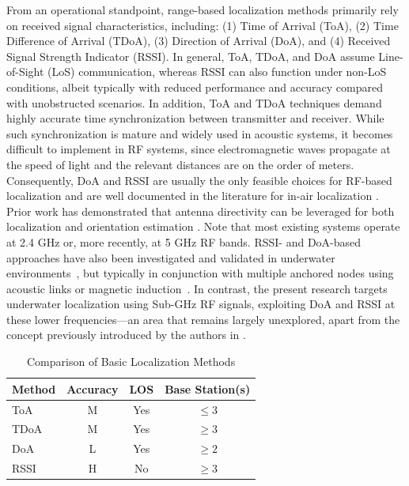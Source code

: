 \documentclass[subscriptcorrection,upint,varvw,barcolor=Goldenrod3,mathalfa=cal=euler,balance,hyphenate,pdf-a]{asmejour}
\begin{document}
From an operational standpoint, range-based localization methods primarily rely on received signal characteristics, including: (1) Time of Arrival (ToA), (2) Time Difference of Arrival (TDoA), (3) Direction of Arrival (DoA), and (4) Received Signal Strength Indicator (RSSI). In general, ToA, TDoA, and DoA assume Line-of-Sight (LoS) communication, whereas RSSI can also function under non-LoS conditions, albeit typically with reduced performance and accuracy compared with unobstructed scenarios. In addition, ToA and TDoA techniques demand highly accurate time synchronization between transmitter and receiver. While such synchronization is mature and widely used in acoustic systems, it becomes difficult to implement in RF systems, since electromagnetic waves propagate at the speed of light and the relevant distances are on the order of meters. Consequently, DoA and RSSI are usually the only feasible choices for RF-based localization and are well documented in the literature for in-air localization \cite{Tomic2019,Ketabalian2020,Wu2024}. Prior work has demonstrated that antenna directivity can be leveraged for both localization \cite{Jiang2013} and orientation estimation \cite{Wielandner2021}. Note that most existing systems operate at 2.4 GHz or, more recently, at 5 GHz RF bands. RSSI- and DoA-based approaches have also been investigated and validated in underwater environments~\cite{Sathish2023,Luo2021Review}, but typically in conjunction with multiple anchored nodes using acoustic links or magnetic induction~\cite{Garcia2020}. In contrast, the present research targets underwater localization using Sub-GHz RF signals, exploiting DoA and RSSI at these lower frequencies—an area that remains largely unexplored, apart from the concept previously introduced by the authors in \cite{Masood2025}.
\begin{table}
\centering
\caption{Comparison of Basic Localization Methods \cite{zekavat2019handbook}}
\label{tab:comparisonliterature}
\begin{tabularx}{0.4\textwidth}{lccc}
\toprule
\textbf{Method} & \textbf{Accuracy} \footnotemark[1] & \textbf{LOS} & \textbf{Base Station(s)} \\
\midrule
ToA & M & Yes & $\leq3$ \\
TDoA & M & Yes & $\geq3$ \\
DoA & L & Yes & $\geq2$ \\
RSSI & H & No & $\geq3$ \\
\bottomrule
\end{tabularx}
\end{table}
\end{document}

